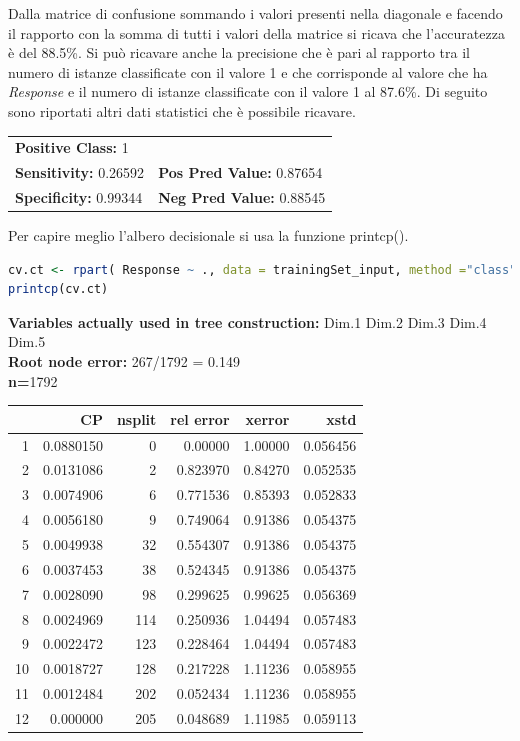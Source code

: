 \documentclass[letterpaper,11pt]{article}
\begin{document}
Dalla matrice di confusione sommando i valori presenti nella diagonale e facendo il rapporto con la somma di tutti i valori della matrice si ricava che l'accuratezza è del 88.5\%.
Si può ricavare anche la precisione che è pari al rapporto tra il numero di istanze   classificate con il valore 1 e che corrisponde al valore che ha \textit{Response} e il numero di istanze classificate con il valore 1 al 87.6\%.
Di seguito sono riportati altri dati statistici che è possibile ricavare. 

\begin{table}[h!]
\centering
\begin{tabular}{ll}
\multicolumn{2}{l}{\textbf{Positive Class:} 1}          \\
\textbf{Sensitivity:} 0.26592 & \textbf{Pos Pred Value:} 0.87654 \\
\textbf{Specificity:} 0.99344 & \textbf{Neg Pred Value:} 0.88545
\end{tabular}
\end{table}

Per capire meglio l'albero decisionale si usa la funzione printcp().

\begin{lstlisting}[language=R]
cv.ct <- rpart( Response ~ ., data = trainingSet_input, method ="class", cp = 0, minsplit = 2, xval = 10)
printcp(cv.ct)
\end{lstlisting}

\textbf{Variables actually used in tree construction:} Dim.1 Dim.2 Dim.3 Dim.4 Dim.5\\
\textbf{Root node error:} 267/1792 = 0.149\\
\textbf{n=}1792 

\begin{table}[ht]
\centering
\begin{tabular}{rrrrrr}
  \hline
 & CP & nsplit & rel error & xerror & xstd \\ 
  \hline
1 & 0.0880150 & 0 & 0.00000 & 1.00000 & 0.056456 \\ 
  2 & 0.0131086 & 2 & 0.823970 & 0.84270 & 0.052535 \\ 
  3 & 0.0074906 & 6 & 0.771536 & 0.85393 & 0.052833 \\ 
  4 & 0.0056180 & 9 & 0.749064 & 0.91386 & 0.054375 \\ 
  5 & 0.0049938 & 32 & 0.554307 & 0.91386 & 0.054375 \\ 
  6 & 0.0037453 & 38 & 0.524345 & 0.91386 & 0.054375 \\ 
  7 & 0.0028090 & 98 & 0.299625 & 0.99625 & 0.056369 \\ 
  8 & 0.0024969 & 114 & 0.250936 & 1.04494 & 0.057483 \\ 
  9 & 0.0022472 & 123 & 0.228464 & 1.04494 & 0.057483 \\ 
  10 & 0.0018727 & 128 & 0.217228 & 1.11236 & 0.058955 \\ 
  11 & 0.0012484 & 202 & 0.052434 & 1.11236 & 0.058955 \\ 
  12 & 0.000000 & 205 & 0.048689 & 1.11985 & 0.059113 \\ 
   \hline
\end{tabular}
\end{table}
\end{document}
